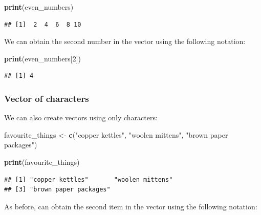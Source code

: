 \documentclass[
]{krantz}
\makeatletter
\newenvironment{Shaded}{\begin{snugshade}}{\end{snugshade}}
\newcommand{\DecValTok}[1]{\textcolor[rgb]{0.06,0.06,0.06}{#1}}
\newcommand{\KeywordTok}[1]{\textcolor[rgb]{0.27,0.27,0.27}{\textbf{#1}}}
\newcommand{\NormalTok}[1]{#1}
\newcommand{\StringTok}[1]{\textcolor[rgb]{0.5,0.5,0.5}{#1}}
\newenvironment{kframe}{%
\medskip{}
\setlength{\fboxsep}{.8em}
 \def\at@end@of@kframe{}%
 \ifinner\ifhmode%
  \def\at@end@of@kframe{\end{minipage}}%
  \begin{minipage}{\columnwidth}%
 \fi\fi%
 \def\FrameCommand##1{\hskip\@totalleftmargin \hskip-\fboxsep
 \colorbox{shadecolor}{##1}\hskip-\fboxsep
     \hskip-\linewidth \hskip-\@totalleftmargin \hskip\columnwidth}%
 \MakeFramed {\advance\hsize-\width
   \@totalleftmargin\z@ \linewidth\hsize
   \@setminipage}}%
 {\par\unskip\endMakeFramed%
 \at@end@of@kframe}
\renewenvironment{Shaded}{\begin{kframe}}{\end{kframe}}
\makeatother
\begin{document}
\begin{Shaded}
\begin{Highlighting}[]
\KeywordTok{print}\NormalTok{(even_numbers)}
\end{Highlighting}
\end{Shaded}

\begin{verbatim}
## [1]  2  4  6  8 10
\end{verbatim}

We can obtain the second number in the vector using the following notation:

\begin{Shaded}
\begin{Highlighting}[]
\KeywordTok{print}\NormalTok{(even_numbers[}\DecValTok{2}\NormalTok{])}
\end{Highlighting}
\end{Shaded}

\begin{verbatim}
## [1] 4
\end{verbatim}

\hypertarget{vector-of-characters}{%
\subsubsection{Vector of characters}\label{vector-of-characters}}

We can also create vectors using only characters:

\begin{Shaded}
\begin{Highlighting}[]
\NormalTok{favourite_things <-}\StringTok{ }\KeywordTok{c}\NormalTok{(}\StringTok{"copper kettles"}\NormalTok{, }\StringTok{"woolen mittens"}\NormalTok{, }\StringTok{"brown paper packages"}\NormalTok{)}
\end{Highlighting}
\end{Shaded}

\begin{Shaded}
\begin{Highlighting}[]
\KeywordTok{print}\NormalTok{(favourite_things)}
\end{Highlighting}
\end{Shaded}

\begin{verbatim}
## [1] "copper kettles"       "woolen mittens"      
## [3] "brown paper packages"
\end{verbatim}

As before, can obtain the second item in the vector using the following notation:
\end{document}
